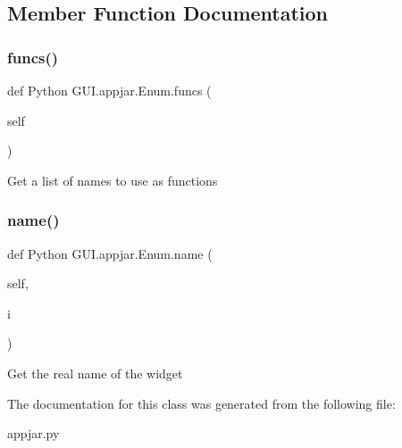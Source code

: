 \subsection{Member Function Documentation}
\mbox{\label{class_python_01_g_u_i_1_1appjar_1_1_enum_a1410577438bbf4679bd5819238f98f50}} 
\subsubsection{\texorpdfstring{funcs()}{funcs()}}
{\footnotesize\ttfamily def Python G\+U\+I.\+appjar.\+Enum.\+funcs (\begin{DoxyParamCaption}\item[{}]{self }\end{DoxyParamCaption})}

\begin{DoxyVerb}Get a list of names to use as functions \end{DoxyVerb}
 \mbox{\label{class_python_01_g_u_i_1_1appjar_1_1_enum_a272c5483812543eeffcb4ab15822a467}} 
\subsubsection{\texorpdfstring{name()}{name()}}
{\footnotesize\ttfamily def Python G\+U\+I.\+appjar.\+Enum.\+name (\begin{DoxyParamCaption}\item[{}]{self,  }\item[{}]{i }\end{DoxyParamCaption})}

\begin{DoxyVerb}Get the real name of the widget\end{DoxyVerb}
 

The documentation for this class was generated from the following file\+:\begin{DoxyCompactItemize}
\item 
appjar.\+py\end{DoxyCompactItemize}
